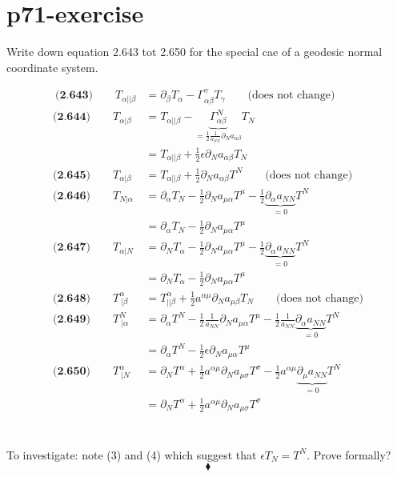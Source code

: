 \section{p71-exercise}
\begin{tcolorbox}
Write down equation 2.643 tot 2.650 for the special cae of a geodesic normal coordinate system.
\end{tcolorbox}
\begin{align}
\ \textbf{(2.643)}\quad \quad T_{\alpha || \beta} &= \partial_{\beta}T_{\alpha} - \Gamma^{\gamma}_{\alpha\beta}T_{\gamma}\quad\quad \text{(does not change)}\\
\textbf{(2.644)}\quad \quad T_{\alpha | \beta} &=T_{\alpha || \beta}  - \underbrace{\Gamma^{N}_{\alpha\beta}}_{=\frac{1}{2} \frac{1}{a_{NN}}\partial_N  a_{\alpha\beta}}T_{N}\\
&=T_{\alpha || \beta}  +\frac{1}{2} \epsilon\partial_N  a_{\alpha\beta}T_{N}\\
\textbf{(2.645)}\quad \quad T_{\alpha | \beta} &=T_{\alpha || \beta}  +\frac{1}{2}\partial_N  a_{\alpha\beta}T^{N}\quad\quad \text{(does not change)}\\
\textbf{(2.646)}\quad \quad T_{N| \alpha } &=\partial_{\alpha}T_N  -\frac{1}{2}\partial_N  a_{\mu\alpha}T^{\mu} -\frac{1}{2}\underbrace{\partial_{\alpha}  a_{NN}}_{=0}T^{N}\\
&=\partial_{\alpha}T_N  -\frac{1}{2}\partial_N  a_{\mu\alpha}T^{\mu} \\
\textbf{(2.647)}\quad \quad T_{ \alpha |N } &=\partial_N T_{\alpha}  -\frac{1}{2}\partial_N  a_{\mu\alpha}T^{\mu} -\frac{1}{2}\underbrace{\partial_{\alpha}  a_{NN}}_{=0}T^{N}\\
&=\partial_N T_{\alpha}  -\frac{1}{2}\partial_N  a_{\mu\alpha}T^{\mu} \\
\textbf{(2.648)}\quad \quad T^{\alpha}_{ \  | \beta} &=T^{\alpha}_{ || \beta}  + \frac{1}{2}a^{\alpha\mu}\partial_N  a_{\mu\beta}T_{N}\quad\quad\text{(does not change)}\\
\textbf{(2.649)}\quad \quad T^N_{ \ | \alpha} &=\partial_{\alpha}T^N  -\frac{1}{2}\frac{1}{a_{NN}}\partial_N  a_{\mu\alpha}T^{\mu} -\frac{1}{2}\frac{1}{a_{NN}}\underbrace{\partial_{\alpha}  a_{NN}}_{=0}T^{N}\\
\ &= \partial_{\alpha}T^N  -\frac{1}{2}\epsilon\partial_N  a_{\mu\alpha}T^{\mu} \\
\textbf{(2.650)}\quad \quad T^{\alpha}_{\ |N} &=\partial_N T^{\alpha}  +\frac{1}{2}a^ {\alpha\mu}\partial_N  a_{\mu\sigma}T^{\sigma} -\frac{1}{2}a^{\alpha\mu}\underbrace{\partial_{\mu}  a_{NN}}_{=0}T^{N}\\
\ &=\partial_N T^{\alpha}  +\frac{1}{2}a^ {\alpha\mu}\partial_N  a_{\mu\sigma}T^{\sigma} 
\end{align}
\\\\
To investigate: note (3) and (4) which suggest that $\epsilon T_{N} = T^{N}$. Prove formally?
$$\blacklozenge$$
\newpage


